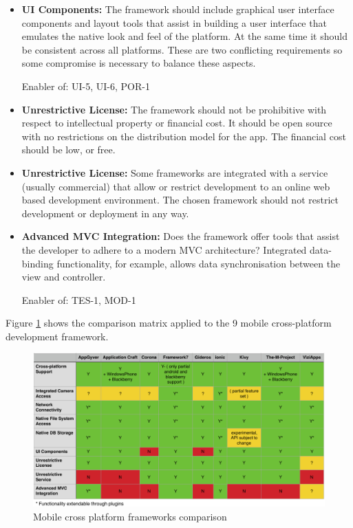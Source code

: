 \begin{itemize}[label={}]
Enabler of: INT-1, INT-2, INT-3, Metadata.Location.*, Metadata.Text.*, Archive.Save, Archive.Browse, Archive.Select.*

\item \textbf{UI Components:} The framework should include graphical user interface components and layout tools that assist in building a user interface that emulates the native look and feel of the platform. At the same time it should be consistent across all platforms. These are two conflicting requirements so some compromise is necessary to balance these aspects.

Enabler of: UI-5, UI-6, POR-1

\item \textbf{Unrestrictive License:} The framework should not be prohibitive with respect to intellectual property or financial cost. It should be open source with no restrictions on the distribution model for the app. The financial cost should be low, or free.

\item \textbf{Unrestrictive License:} Some frameworks are integrated with a service (usually commercial) that allow or restrict development to an online web based development environment. The chosen framework should not restrict development or deployment in any way.


\item \textbf{Advanced MVC Integration:} Does the framework offer tools that assist the developer to adhere to a modern MVC architecture? Integrated data-binding functionality, for example, allows data synchronisation between the view and controller.

Enabler of: TES-1, MOD-1

\end{itemize}

Figure \ref{fig:comp_fw} shows the comparison matrix applied to the 9 mobile cross-platform development framework.

\begin{figure}[H]
    \centering
    \includegraphics[width=\textwidth,keepaspectratio]{assets/architecture/framework_comparison.pdf}
    \caption{Mobile cross platform frameworks comparison}
    \label{fig:comp_fw}
\end{figure}

